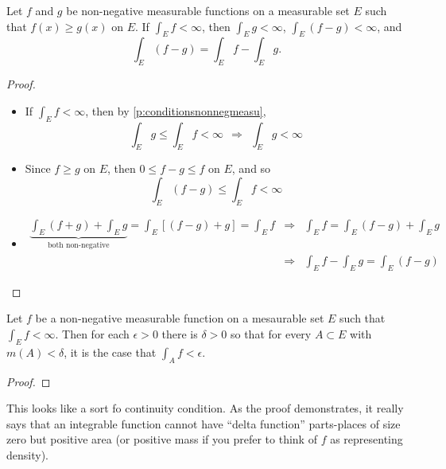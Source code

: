 \begin{pblm}\label{p:nonnegmeas_infty}%
	Let $f$ and $g$ be non-negative measurable functions on a measurable set $E$ such that 
	$f(x) \ge g(x)$ on $E$. If $\int_E f < \infty$, then $\int_E g < \infty$, 
	$\int_E(f-g) < \infty$, and 
	\begin{equation*}
		\int_E(f-g) = \int_Ef - \int_Eg. 
	\end{equation*}
\begin{proof}~
	\begin{itemize}
	\item If $\int_E f < \infty$, then by \ref{p:conditionsnonnegmeasu}, 
		\begin{equation*}
			\int_Eg \le \int_E f < \infty ~~ \Rightarrow ~~ \int_Eg < \infty
		\end{equation*}
	\item Since $f \ge g$ on $E$, then $0 \le f - g \le f$ on $E$, and so 
		\begin{equation*}
			\int_E (f - g) \le \int_E f < \infty
		\end{equation*}
	\item 
		\begin{equation*}
		\begin{array}{rcl}
			\underbrace{\int_E (f + g) + \int_Eg}_{\text{both non-negative}} = 
			\int_E\left[(f - g) + g\right] = \int_Ef & \Rightarrow & \int_Ef = 
			\int_E(f-g)+\int_Eg\\
			& \Rightarrow & \int_Ef - \int_Eg = \int_E(f - g)
		\end{array}
		\end{equation*}
	\end{itemize}
\end{proof}
\end{pblm}

\begin{pblm}%
	Let $f$ be a non-negative measurable function on a mesaurable set $E$ such that 
	$\int_E f < \infty$. Then for each $\epsilon > 0$ there is $\delta > 0$ so that 
	for every $A \subset E$ with $m(A) < \delta$, it is the case that $\int_Af<\epsilon$. 
\begin{proof}
\end{proof}
\end{pblm}

\begin{rmk}%
	This looks like a sort fo continuity condition. As the proof demonstrates, it 
	really says that an integrable function cannot have ``delta function'' 
	parts-places of size zero but positive area (or positive mass if you prefer to 
	think of $f$ as representing density). 
\end{rmk}

